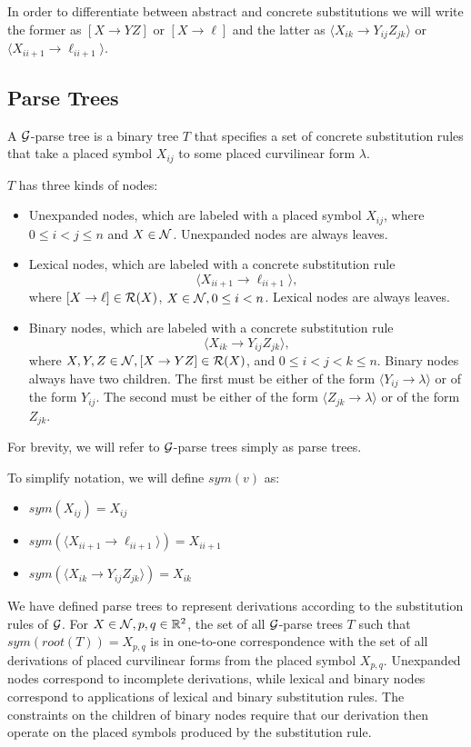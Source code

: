 \documentclass{article}
\begin{document}
In order to differentiate between abstract and concrete substitutions
we will write the former as $[X\to YZ]$ or $[X\to \ell]$ and the
latter as $\langle X_{ik} \to Y_{ij} Z_{jk} \rangle$ or $\langle X_{i
  i+1} \to \ell_{i i+1} \rangle$.

\subsection{Parse Trees}

\begin{defn}
  A ${\mathcal G}$-parse tree is a binary tree $T$ that specifies a set
  of concrete substitution rules that take a placed symbol $X_{ij}$
  to some placed curvilinear form $\lambda$.

  $T$ has three kinds of nodes:
  \begin{itemize}
  \item Unexpanded nodes, which are labeled with a placed symbol
    $X_{ij}$, where $0\le i < j \le n$ and $X\in {\mathcal N}$. Unexpanded
    nodes are always leaves.
  \item Lexical nodes, which are labeled with a concrete substitution
    rule $$\langle X_{i i+1} \to \ell_{i i+1}\rangle,$$ where $[X\to \ell]\in
    {\mathcal R}(X)$, $X\in {\mathcal N}, 0\le i < n$. Lexical nodes are always leaves.
  \item Binary nodes, which are labeled with a concrete substitution
    rule $$\langle X_{ik}\to Y_{ij} Z_{jk}\rangle,$$ where $X,Y,Z\in
    {\mathcal N}, [X\to YZ]\in {\mathcal R}(X)$, and $0 \le i < j < k \le n$. Binary
    nodes always have two children. The first must be either of the
    form $\langle Y_{ij} \to \lambda \rangle$ or of the form $Y_{ij}$.
    The second must be either of the form $\langle Z_{jk} \to \lambda
    \rangle$ or of the form $Z_{jk}$.
  \end{itemize}
\end{defn}
For brevity, we will refer to ${\mathcal G}$-parse trees simply as parse
trees.

To simplify notation, we will define $sym(v)$ as:
\begin{itemize}
\item $sym(X_{ij}) = X_{ij}$
\item $sym(\langle X_{i i+1} \to \ell_{i i+1}\rangle) = X_{i i+1}$
\item $sym(\langle X_{ik} \to Y_{ij} Z_{jk}\rangle) = X_{i k}$
\end{itemize}

We have defined parse trees to represent derivations according to the
substitution rules of ${\mathcal G}$.  For $X\in {\mathcal N}, p,q\in \mathbb{R}^2$, the set
of all ${\mathcal G}$-parse trees $T$ such that $sym(root(T)) = X_{p,q}$ is in
one-to-one correspondence with the set of all derivations of placed
curvilinear forms from the placed symbol $X_{p,q}$. Unexpanded nodes
correspond to incomplete derivations, while lexical and binary nodes
correspond to applications of lexical and binary substitution
rules. The constraints on the children of binary nodes require that
our derivation then operate on the placed symbols produced by the
substitution rule.
\end{document}
